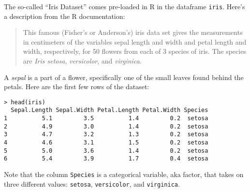\documentclass[addpoints,12pt]{exam}
\begin{document}
\begin{questions}


\newpage

\question The so-called ``Iris Dataset'' comes pre-loaded in R in the dataframe \texttt{iris}. Here's a description from the R documentation:
	\begin{quote}
		This famous (Fisher's or Anderson's) iris data set gives the measurements in centimeters of the variables sepal length and width and petal length and width, respectively, for 50 flowers from each of 3 species of iris. The species are \emph{Iris setosa}, \emph{versicolor}, and \emph{virginica}.
	\end{quote}
A \emph{sepal} is a part of a flower, specifically one of the small leaves found behind the petals. Here are the first few rows of the dataset:
\begin{verbatim}
> head(iris)
  Sepal.Length Sepal.Width Petal.Length Petal.Width Species
1          5.1         3.5          1.4         0.2  setosa
2          4.9         3.0          1.4         0.2  setosa
3          4.7         3.2          1.3         0.2  setosa
4          4.6         3.1          1.5         0.2  setosa
5          5.0         3.6          1.4         0.2  setosa
6          5.4         3.9          1.7         0.4  setosa
\end{verbatim}
Note that the column \texttt{Species} is a categorical variable, aka factor, that takes on three different values: \texttt{setosa}, \texttt{versicolor}, and \texttt{virginica}.
\begin{parts}

\end{parts}
\end{questions}
\end{document}
